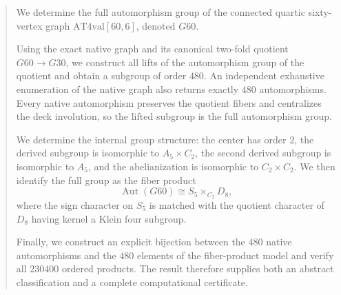 \begin{abstract}
We determine the full automorphism group of the connected quartic
sixty-vertex graph $\mathrm{AT4val}[60,6]$, denoted $G60$.

Using the exact native graph and its canonical two-fold quotient
$G60 \to G30$, we construct all lifts of the automorphism group of the
quotient and obtain a subgroup of order $480$. An independent exhaustive
enumeration of the native graph also returns exactly $480$ automorphisms.
Every native automorphism preserves the quotient fibers and centralizes
the deck involution, so the lifted subgroup is the full automorphism
group.

We determine the internal group structure:
the center has order $2$, the derived subgroup is isomorphic to
$A_5 \times C_2$, the second derived subgroup is isomorphic to $A_5$,
and the abelianization is isomorphic to $C_2 \times C_2$.
We then identify the full group as the fiber product
\[
\operatorname{Aut}(G60)
\cong
S_5 \times_{C_2} D_8,
\]
where the sign character on $S_5$ is matched with the quotient character
of $D_8$ having kernel a Klein four subgroup.

Finally, we construct an explicit bijection between the $480$ native
automorphisms and the $480$ elements of the fiber-product model and
verify all $230400$ ordered products. The result therefore supplies both
an abstract classification and a complete computational certificate.
\end{abstract}
